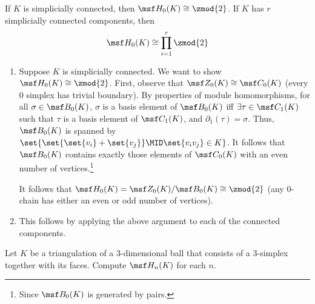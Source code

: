 \begin{problem}[16.8]
  If $K$ is simplicially connected, then $\msf H_0(K) \cong \zmod{2}$. If $K$
  has $r$ simplicially connected components, then
  \[
    \msf H_0(K)\cong \prod_{i=1}^r \zmod{2}
  \]
\end{problem}
\begin{solution}
  \begin{enumerate}
  \item Suppose $K$ is simplicially connected. We want to show $\msf H_0(K)
    \cong \zmod{2}$. First, observe that $\msf Z_0(K) \cong \msf C_0(K)$
    (every 0 simplex has trivial boundary). By properties of module
    homomorphisms, for all $\sigma \in \msf B_0(K)$, $\sigma$ is a basis
    element of $\msf B_0(K)$ iff $\exists \tau \in \msf C_1(K)$ such that
    $\tau$ is a basis element of $\msf C_1(K)$, and $\partial_1(\tau) =
    \sigma$. Thus, $\msf B_0(K)$ is spanned by $\set{\set{\set{v_i} +
        \set{v_j}} \MID \set{v_iv_j} \in K}$. It follows that $\msf B_0(K)$
    contains exactly those elements of $\msf C_0(K)$ with an even number of
    vertices.\footnote{Since $\msf B_0(K)$ is generated by pairs.}

    It follows that $\msf H_0(K) = \msf Z_0(K)/\msf B_0(K) \cong \zmod{2}$
    (any $0$-chain has either an even or odd number of vertices).
  \item This follows by applying the above argument to each of the connected
    components.
  \end{enumerate}
\end{solution}
\begin{problem}[16.9]
  Let $K$ be a triangulation of a $3$-dimensional ball that consists of a
  3-simplex together with its faces. Compute $\msf H_n(K)$ for each $n$.
\end{problem}
